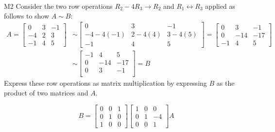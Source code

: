 \begin{problem}{M2}
Consider the two row operations 
\(R_2-4R_3\to R_2\) and \(R_1\leftrightarrow R_3\)
applied as follows to show \(A\sim B\):
\begin{align*}
A
  =
\begin{bmatrix}
0&3&-1\\
-4&2&3\\
-1&4&5
\end{bmatrix}
  &\sim
\begin{bmatrix}
0&3&-1\\
-4-4(-1)&2-4(4)&3-4(5)\\
-1&4&5
\end{bmatrix}
  =
\begin{bmatrix}
0&3&-1\\
0&-14&-17\\
-1&4&5
\end{bmatrix}
  \\&\sim
\begin{bmatrix}
-1&4&5\\
0&-14&-17\\
0&3&-1\\
\end{bmatrix}
  = 
B
\end{align*}
Express these row operations as matrix multiplication
by expressing \(B\) as the product of two matrices and \(A\).
\end{problem}
\begin{solution}
\[
B
  =
\begin{bmatrix}
  0&0&1\\
  0&1&0\\
  1&0&0
\end{bmatrix}
\begin{bmatrix}
  1&0&0\\
  0&1&-4\\
  0&0&1
\end{bmatrix}
A
\]
\end{solution}
